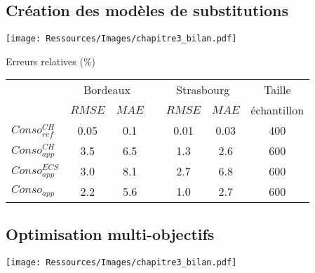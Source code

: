 \documentclass[xcolor=x11names, compress, 11pt]{beamer}
\begin{document}
\subsection{Création des modèles de substitutions}
\begin{frame}[t]
    \vfill
    \centering
    \texttt{[image: Ressources/Images/chapitre3\_bilan.pdf]}
    \vfill
\end{frame}

\begin{frame}[c]
    \vfill
    \centering
    \tiny
    \begin{table}
    Erreurs relatives (\si{\percent})
    \vfill
    \begin{tabular}{l c c c c c c}
        \toprule
                        & \multicolumn{2}{c}{Bordeaux} & & \multicolumn{2}{c}{Strasbourg} &
                          Taille \\
                        \cmidrule(r){2-3}
                        \cmidrule(r){5-6}
                        & $RMSE$ & $MAE$   &       & $RMSE$ & $MAE$ & échantillon \\
        \midrule
        $Conso_{ref}^{CH}$  & \num{0.05}  & \num{0.1}  &  & \num{0.01}   & \num{0.03}  & \num{400}  \\
        \addlinespace[\defaultaddspace]
        $Conso_{app}^{CH}$  & \num{3.5}  & \num{6.5} &  & \num{1.3}   & \num{2.6}  & \num{600} \\
        \addlinespace[\defaultaddspace]
        $Conso_{app}^{ECS}$ & \num{3.0} & \num{8.1} & & \num{2.7}   & \num{6.8}  & \num{600} \\
        \addlinespace[\defaultaddspace]
        $Conso_{app}$       & \num{2.2} & \num{5.6} & & \num{1.0}   & \num{2.7}  & \num{600} \\
        \bottomrule
    \end{tabular}
    \end{table}
    \vfill
    \vfill
\end{frame}



\subsection{Optimisation multi-objectifs}
\begin{frame}[t]
    \vfill
    \centering
    \texttt{[image: Ressources/Images/chapitre3\_bilan.pdf]}
    \vfill
\end{frame}
\end{document}
